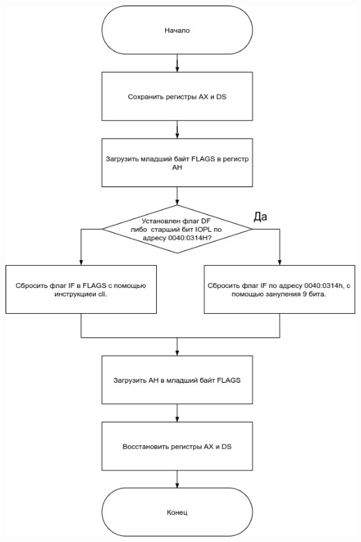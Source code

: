 \documentclass[12pt]{extreport}
\begin{document}
\begin{center}
\includegraphics[scale=0.7]{./inc/img/sub_1.jpg} 
\end{center}
\end{document}

